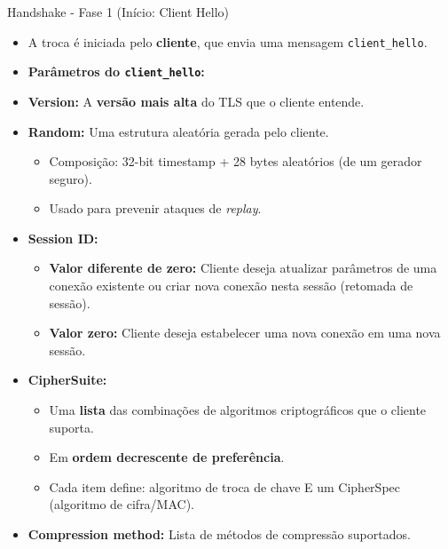 \begin{frame}{Handshake - Fase 1 (Início: Client Hello)}
    \begin{itemize}
        \item A troca é iniciada pelo \textbf{cliente}, que envia uma mensagem \texttt{client\_hello}.
        \item \textbf{Parâmetros do \texttt{client\_hello}:}

        \item \textbf{Version:} A \textbf{versão mais alta} do TLS que o cliente entende.

        \item \textbf{Random:} Uma estrutura aleatória gerada pelo cliente.
              \begin{itemize}
                  \item Composição: 32-bit timestamp + 28 bytes aleatórios (de um gerador seguro).
                  \item Usado para prevenir ataques de \textit{replay}.
              \end{itemize}

        \item \textbf{Session ID:}
              \begin{itemize}
                  \item \textbf{Valor diferente de zero:} Cliente deseja atualizar parâmetros de uma conexão existente ou criar nova conexão nesta sessão (retomada de sessão).
                  \item \textbf{Valor zero:} Cliente deseja estabelecer uma nova conexão em uma nova sessão.
              \end{itemize}

        \item \textbf{CipherSuite:}
              \begin{itemize}
                  \item Uma \textbf{lista} das combinações de algoritmos criptográficos que o cliente suporta.
                  \item Em \textbf{ordem decrescente de preferência}.
                  \item Cada item define: algoritmo de troca de chave E um CipherSpec (algoritmo de cifra/MAC).
              \end{itemize}

        \item \textbf{Compression method:} Lista de métodos de compressão suportados.
    \end{itemize}
\end{frame}

